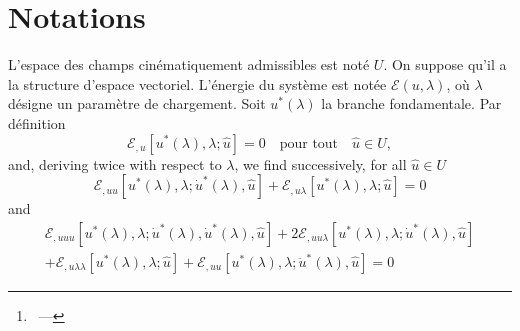 \documentclass[12pt, final]{scrartcl}
\theoremstyle{definition}
\newcommand{\E}{\mathcal E}
\begin{document}
\title{\sbtitle}
\author{\sbauthor\thanks{\sbaddress~--- \sbemail}}
\maketitle

\begin{abstract}
  These are my notes on the LSK method for the analysis of the stability and
  bifurcation(s) of a conservative system. These notes are based on several
  references: Koiter's initial PhD thesis~\parencite{koit1945} as well as some
  graphical illustrations from his lecture notes~\parencite{koit2009}. I enjoyed
  the concise presentation of \textcite{nguy2000} as well as the lecture notes
  of \textcite{tria2017}. Finally, the chapter by \textcite{poti1987} helped me
  clear some issues.

  These notes by Sébastien Brisard are licensed under a Creative Commons
  Attribution 4.0 International License. To view a copy of this license, visit
  \url{http://creativecommons.org/licenses/by/4.0/}.

  I hope the reader will find these notes useful, even though there are still a
  few points which I do not fully understand (they are clearly indicated in the
  text).
\end{abstract}

\section{Notations}

L'espace des champs cinématiquement admissibles est noté $U$. On suppose qu'il
a la structure d'espace vectoriel. L'énergie du système est notée $\E(u, \lambda)$,
où $\lambda$ désigne un paramètre de chargement. Soit $u^{\ast}(\lambda)$ la branche
fondamentale. Par définition
\begin{equation}
  \E_{,u}[u^{\ast}(\lambda), \lambda; \hat{u}]=0 \quad \text{pour tout} \quad \hat{u}\in U,
\end{equation}
and, deriving twice with respect to $\lambda$, we find successively, for all $\hat{u} \in U$
\begin{equation}
  \label{eq:20220901143843}
  \E_{,uu}[u^\ast(\lambda), \lambda; \dot{u}^\ast(\lambda), \hat{u}] + \E_{,u\lambda}[u^\ast(\lambda), \lambda; \hat{u}] = 0
\end{equation}
and
\begin{multline}
  \label{eq:20220901143902}
  \E_{,uuu}[u^\ast(\lambda), \lambda; \dot{u}^\ast(\lambda), \dot{u}^\ast(\lambda), \hat{u}] + 2\E_{,uu\lambda}[u^\ast(\lambda), \lambda; \dot{u}^\ast(\lambda), \hat{u}]\\
  + \E_{,u\lambda\lambda}[u^\ast(\lambda), \lambda; \hat{u}] + \E_{,uu}[u^\ast(\lambda), \lambda; \ddot{u}^\ast(\lambda), \hat{u}] = 0
\end{multline}
\end{document}
